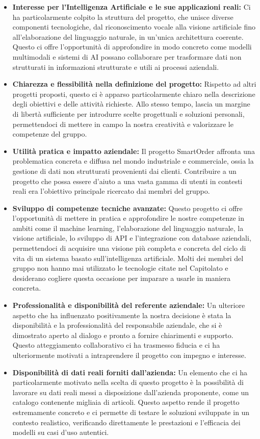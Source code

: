\documentclass[a4paper,12pt]{article}
\begin{document}
\begin{itemize}
    \item \textbf{Interesse per l’Intelligenza Artificiale e le sue applicazioni reali:} Ci ha particolarmente colpito la struttura del progetto, che unisce diverse componenti tecnologiche, dal riconoscimento vocale alla visione artificiale fino all’elaborazione del linguaggio naturale, in un’unica architettura coerente. Questo ci offre l’opportunità di approfondire in modo concreto come modelli multimodali e sistemi di AI possano collaborare per trasformare dati non strutturati in informazioni strutturate e utili ai processi aziendali.
    \item \textbf{Chiarezza e flessibilità nella definizione del progetto:} Rispetto ad altri progetti proposti, questo ci è apparso particolarmente chiaro nella descrizione degli obiettivi e delle attività richieste. Allo stesso tempo, lascia un margine di libertà sufficiente per introdurre scelte progettuali e soluzioni personali, permettendoci di mettere in campo la nostra creatività e valorizzare le competenze del gruppo.
    \item \textbf{Utilità pratica e impatto aziendale:} Il progetto SmartOrder affronta una problematica concreta e diffusa nel mondo industriale e commerciale, ossia la gestione di dati non strutturati provenienti dai clienti. Contribuire a un progetto che possa essere d’aiuto a una vasta gamma di utenti in contesti reali era l’obiettivo principale ricercato dai membri del gruppo.
    \item \textbf{Sviluppo di competenze tecniche avanzate:} Questo progetto ci offre l’opportunità di mettere in pratica e approfondire le nostre competenze in ambiti come il machine learning, l’elaborazione del linguaggio naturale, la visione artificiale, lo sviluppo di API e l’integrazione con database aziendali, permettendoci di acquisire una visione più completa e concreta del ciclo di vita di un sistema basato sull’intelligenza artificiale. Molti dei membri del gruppo non hanno mai utilizzato le tecnologie citate nel Capitolato e desiderano cogliere questa occasione per imparare a usarle in maniera concreta.
    \item \textbf{Professionalità e disponibilità del referente aziendale:} Un ulteriore aspetto che ha influenzato positivamente la nostra decisione è stata la disponibilità e la professionalità del responsabile aziendale, che si è dimostrato aperto al dialogo e pronto a fornire chiarimenti e supporto. Questo atteggiamento collaborativo ci ha trasmesso fiducia e ci ha ulteriormente motivati a intraprendere il progetto con impegno e interesse.
    \item \textbf{Disponibilità di dati reali forniti dall’azienda:} Un elemento che ci ha particolarmente motivato nella scelta di questo progetto è la possibilità di lavorare su dati reali messi a disposizione dall’azienda proponente, come un catalogo contenente migliaia di articoli. Questo aspetto rende il progetto estremamente concreto e ci permette di testare le soluzioni sviluppate in un contesto realistico, verificando direttamente le prestazioni e l’efficacia dei modelli su casi d’uso autentici.
\end{itemize}
\end{document}
